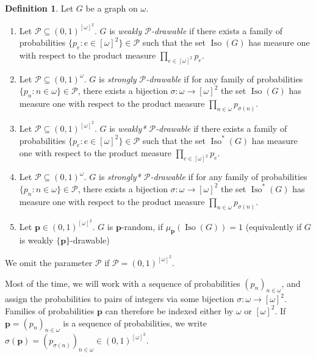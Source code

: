 \documentclass{amsart}
\theoremstyle{plain}
\theoremstyle{definition}
\newtheorem{df}[theorem]{Definition}
\theoremstyle{remark}
\numberwithin{equation}{section}
\DeclareMathOperator{\iso}{Iso}
\newcommand{\PP}{\mathcal{P}}
\newcommand{\s}{\subseteq}
\begin{document}
\begin{df}
Let $G$ be a graph on $\omega$.
\begin{enumerate}
    \item Let $\PP\s (0,1)^{[\omega]^2}$. $G$ is \emph{weakly $\PP$-drawable} if there exists a family of probabilities $\{p_e : e \in [\omega]^2\} \in \PP$ such that
    the set $\iso(G)$ has measure one with respect to the product measure 
    $\prod\limits_{e\in[\omega]^2}p_e.$
    

    \item Let $\PP\s (0,1)^{\omega}$. $G$ is \emph{strongly $\PP$-drawable} if for any family of probabilities $\{p_n : n \in\omega \} \in \PP$, there exists a bijection $\sigma: \omega\rightarrow [\omega]^2$
    the set $\iso(G)$ has measure one with respect to the product measure $\prod\limits_{n\in\omega}p_{\sigma(n)}$.

    \item Let $\PP\s (0,1)^{[\omega]^2}$. $G$ is \emph{weakly* $\PP$-drawable} if there exists a family of probabilities $\{p_e : e \in [\omega]^2\} \in \PP$ such that
    the set $\iso^*(G)$ has measure one with respect to the product measure 
    $\prod\limits_{e\in[\omega]^2}p_e.$

    \item Let $\PP\s (0,1)^{\omega}$. $G$ is \emph{strongly* $\PP$-drawable} if for any family of probabilities $\{p_n : n\in\omega\} \in \PP$, there exists a bijection $\sigma: \omega\rightarrow [\omega]^2$
    the set $\iso^*(G)$ has measure one with respect to the product measure $\prod\limits_{n\in\omega}p_{\sigma(n)}$. 

    
    \item Let $\textbf{p}\in(0,1)^{[\omega]^2}$. $G$ is $\textbf{p}$-random, if $\mu_{\textbf{p}}(\iso(G))=1$  (equivalently if $G$ is weakly $\{\textbf{p}\}$-drawable)

\end{enumerate}
    We omit the parameter $\PP$ if $\PP=(0,1)^{[\omega]^2}$.
\end{df}

Most of the time, we will work with a sequence of probabilities $(p_n)_{n\in\omega}$, and assign the probabilities to pairs of integers via some bijection $\sigma: \omega\rightarrow [\omega]^2$. Families of probabilities $\mathbf{p}$ can therefore be indexed either by $\omega$ or $[\omega]^2$. If $\textbf{p}=(p_n)_{n\in \omega}$ is a sequence of probabilities, we write $\sigma(\textbf{p})=(p_{\sigma(n)})_{n\in\omega}\in (0,1)^{[\omega]^2}$. 
\end{document}
